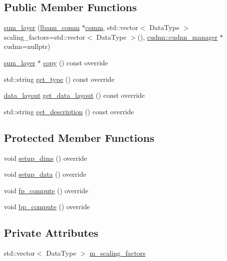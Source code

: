 \subsection*{Public Member Functions}
\begin{DoxyCompactItemize}
\item 
\hyperlink{classlbann_1_1sum__layer_a00dfb715bda89ac6aaa10f045c9a49a5}{sum\+\_\+layer} (\hyperlink{classlbann_1_1lbann__comm}{lbann\+\_\+comm} $\ast$\hyperlink{file__io_8cpp_ab048c6f9fcbcfaa57ce68b00263dbebe}{comm}, std\+::vector$<$ Data\+Type $>$ scaling\+\_\+factors=std\+::vector$<$ Data\+Type $>$(), \hyperlink{classlbann_1_1cudnn_1_1cudnn__manager}{cudnn\+::cudnn\+\_\+manager} $\ast$cudnn=nullptr)
\item 
\hyperlink{classlbann_1_1sum__layer}{sum\+\_\+layer} $\ast$ \hyperlink{classlbann_1_1sum__layer_a8b6581df51a10b1511c1df6322f445a4}{copy} () const override
\item 
std\+::string \hyperlink{classlbann_1_1sum__layer_a852552a520dec8e906b0d76524d73cc4}{get\+\_\+type} () const override
\item 
\hyperlink{base_8hpp_a786677cbfb3f5677b4d84f3056eb08db}{data\+\_\+layout} \hyperlink{classlbann_1_1sum__layer_a6c71a7d29f6e36b2a1f588a2545c769e}{get\+\_\+data\+\_\+layout} () const override
\item 
std\+::string \hyperlink{classlbann_1_1sum__layer_a73e45687c97990d88a2e31dc177ef56e}{get\+\_\+description} () const override
\end{DoxyCompactItemize}
\subsection*{Protected Member Functions}
\begin{DoxyCompactItemize}
\item 
void \hyperlink{classlbann_1_1sum__layer_af7e011a8e1cd89cc9f9c0224182bfb7a}{setup\+\_\+dims} () override
\item 
void \hyperlink{classlbann_1_1sum__layer_a9f8659993a180f1bb1a8bd875814d33b}{setup\+\_\+data} () override
\item 
void \hyperlink{classlbann_1_1sum__layer_a8d235d61507e76f42ee83a74d1098977}{fp\+\_\+compute} () override
\item 
void \hyperlink{classlbann_1_1sum__layer_a0dcddd056cf81c1fbea22a5e1c01c6d9}{bp\+\_\+compute} () override
\end{DoxyCompactItemize}
\subsection*{Private Attributes}
\begin{DoxyCompactItemize}
\item 
std\+::vector$<$ Data\+Type $>$ \hyperlink{classlbann_1_1sum__layer_a371ae9038d8654fbca134e0f61e1e29a}{m\+\_\+scaling\+\_\+factors}
\end{DoxyCompactItemize}
